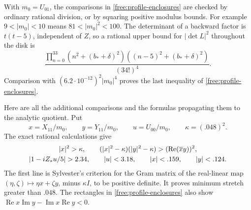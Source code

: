 With $m_0=U_{01}$, the comparisons in
\eqref{free:profile-enclosures} are checked by ordinary rational
division, or by squaring positive modulus bounds.  For example
$9<|m_0|<10$ means $81<|m_0|^2<100$.  The determinant of a backward
factor is $t(t-5)$, independent of $Z$, so a rational upper bound for
$|\det L|^2$ throughout the disk is
\begin{equation}\label{cert:profile-determinant}
 \frac{\displaystyle\prod_{n=0}^{33}
 (n^2+(b_*+\delta)^2)((n-5)^2+(b_*+\delta)^2)}{(34!)^4}.
\end{equation}
Comparison with $(6.2\cdot10^{-12})^2|m_0|^4$ proves the last
inequality of \eqref{free:profile-enclosures}.

Here are all the additional comparisons and the formulas propagating
them to the analytic quotient.  Put
\[
 x=X_{11}/m_0,\qquad y=Y_{11}/m_0,\qquad u=U_{00}/m_0,
 \qquad \kappa=(.048)^2.
\]
The exact rational calculations give
\begin{gather}
 |x|^2>\kappa,\qquad
 (|x|^2-\kappa)(|y|^2-\kappa)
       >(\operatorname{Re}(\overline xy))^2,\notag\\
 |1-iZ_*u/5|>2.34,\qquad |u|<3.18,\qquad
 |x|<.159,\qquad |y|<.124.\label{cert:profile-extra}
\end{gather}
The first line is Sylvester's criterion for the Gram matrix of the
real-linear map $(\eta,\zeta)\mapsto\eta x+\zeta y$, minus
$\kappa I$, to be positive definite.  It proves minimum stretch
greater than $.048$.  The rectangles in
\eqref{free:profile-enclosures} also show
$\operatorname{Re}x\operatorname{Im}y-\operatorname{Im}x\operatorname{Re}y<0$.

